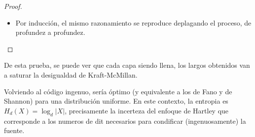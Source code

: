 \begin{proof}
\begin{itemize}
    no hojas (no singletones). Por  inducci\'on, deplegando estos nudos, la capa
    de nudos de la profundez 2 es  llena. De hecho, o (i) tiene solamente hojas,
    o (ii) es llena. En el caso  (ii), viene del enfoque anterior (un nudo vacio
    podr\'ia ``recibir''  un hijo  de la capa  de profundez  3 de un  nudo padre
    no-singleton de  la profundes 2).  En  el caso (i), con  solamente hojas, de
    manera equivalente  (c\'odigo de mismo largo promedio),  se puede considerar
    que llenan los nudos  hijos de $m-1$ padres mas $m' \ge  2$ en los hijos del
    padre  $m$ (si  queda  un  nudo padre  de  la capa  1  sin  hijos de  manera
    equivalente hay un c\'odigo con la capa  1 no llena, y si hay sol\'o uno, se
    podr\'ia desplazar el hijo al  padre, contradictorio con la optimalidad). En
    el caso (i) hay as\'i en total $d-m + (m-1) d + m' = d + (m-1) (d-1) + m'-1$
    hojas de las profundeces 1 y 2. De \ $1 \le m'-1 \le d-1$ \ y la forma de $n
    = d  + q  (d-1)$, necesariamente  $m' =  d$ \ y  la capa  de profundez  2 es
    tambi\'en llena en este caso. Es decir  que los nudos padres de la capa 1, o
    tienen un hijo super-simbolo, o exactamente $d$ hojas.
  \item  Por  inducci\'on, el  mismo  razonamiento  se  reproduce deplagando  el
    proceso, de profundez a profundez.
\end{itemize}
\end{proof}
%
De esta  prueba, se puede ver que  cada capa siendo llena,  los largos obtenidos
van a saturar la desigualdad de Kraft-McMillan.


Volviendo al c\'odigo  ingenuo, ser\'ia \'optimo (y equivalente a  los de Fano y
de Shannon) para  una distribuci\'on uniforme. En este  contexto, la entropia es
$H_d(X)  = \log_d |X|$,  precisamente la  incerteza del  enfoque de  Hartley que
corresponde a los numeros de  dit necesarios para condificar (ingenuosamente) la
fuente.


